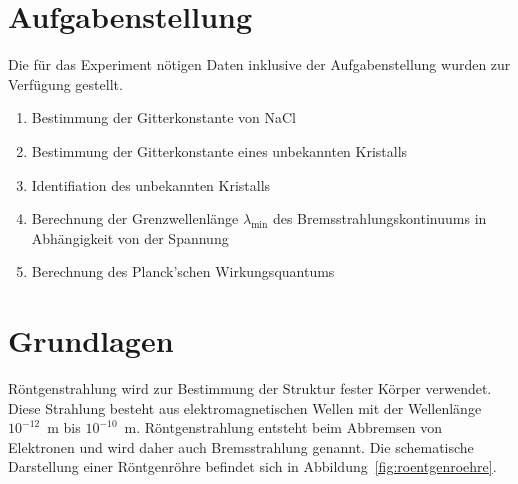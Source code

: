 \documentclass{article}
\begin{document}
\parindent0cm





\pagestyle{fancy}

\section{Aufgabenstellung}

Die für das Experiment nötigen Daten inklusive der Aufgabenstellung wurden zur Verfügung gestellt. 

\begin{enumerate}
\item Bestimmung der Gitterkonstante von NaCl
\item Bestimmung der Gitterkonstante eines unbekannten Kristalls
\item Identifiation des unbekannten Kristalls
\item Berechnung der Grenzwellenlänge $\lambda_{\min}$ des Bremsstrahlungskontinuums in Abhängigkeit von der Spannung
\item Berechnung des Planck'schen Wirkungsquantums 
\end{enumerate}


\section{Grundlagen}

Röntgenstrahlung wird zur Bestimmung der Struktur fester Körper verwendet. Diese Strahlung besteht aus elektromagnetischen Wellen mit der Wellenlänge $10^{-12}$~m bis $10^{-10}$~m. Röntgenstrahlung entsteht beim Abbremsen von Elektronen und wird daher auch Bremsstrahlung genannt. Die schematische Darstellung einer Röntgenröhre befindet sich in Abbildung~\ref{fig:roentgenroehre}.
\end{document}
